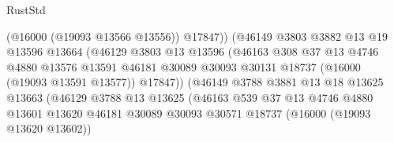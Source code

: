 \begin{lexlean}{RustStd}
\begin{coremodule}
                                        (@16000 (@19093 @13566 @13556))
                                        @17847))
                                    (@46149
                                      @3803
                                      @3882
                                      @13
                                      @19
                                      @13596
                                      @13664
                                      (@46129
                                        @3803
                                        @13
                                        @13596
                                        (@46163
                                          @308
                                          @37
                                          @13
                                          @4746
                                          @4880
                                          @13576
                                          @13591
                                          @46181
                                          @30089
                                          @30093
                                          @30131
                                          @18737
                                          (@16000 (@19093 @13591 @13577))
                                          @17847))
                                      (@46149
                                        @3788
                                        @3881
                                        @13
                                        @18
                                        @13625
                                        @13663
                                        (@46129
                                          @3788
                                          @13
                                          @13625
                                          (@46163
                                            @539
                                            @37
                                            @13
                                            @4746
                                            @4880
                                            @13601
                                            @13620
                                            @46181
                                            @30089
                                            @30093
                                            @30571
                                            @18737
                                            (@16000 (@19093 @13620 @13602))

\end{coremodule}
\end{lexlean}
